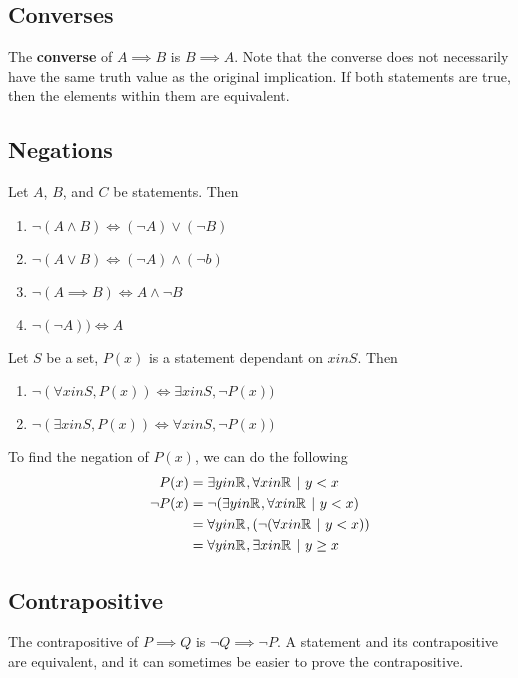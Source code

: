 \documentclass[12pt]{article}
\newcommand{\R}[1]{\mathbb{R}^{#1}}
\begin{document}
\subsection*{Converses}
The {\bf converse} of $A \implies B$ is $B \implies A$. Note that the converse does not necessarily have the same truth value as the original implication. If both statements are true, then the elements within them are equivalent.

\subsection*{Negations}
Let $A$, $B$, and $C$ be statements. Then
\begin{enumerate}
\item $\neg (A \land B) \iff (\neg A) \lor (\neg B)$
\item $\neg (A \lor B) \iff (\neg A) \land (\neg b)$
\item $\neg (A \implies B) \iff A \land \neg B$
\item $\neg (\neg A)) \iff A$
\end{enumerate}

Let $S$ be a set, $P(x)$ is a statement dependant on $x in S$. Then
\begin{enumerate}
\item $\neg (\forall x in S, P(x)) \iff \exists x in S, \neg P(x))$
\item $\neg (\exists x in S, P(x)) \iff \forall x in S, \neg P(x))$
\end{enumerate}

To find the negation of $P(x)$, we can do the following
\begin{align*}
P(x) &= \exists y in \R{}, \forall x in \R{} \suchthat y < x\\
\neg P(x) &= \neg (\exists y in \R{}, \forall x in \R{} \suchthat y < x)\\
&= \forall y in \R{}, (\neg (\forall x in \R{} \suchthat y < x))\\
&= \forall y in \R{}, \exists x in \R{} \suchthat y \geq x
\end{align*}

\subsection*{Contrapositive}
 The contrapositive of $P \implies Q$ is $\neg Q \implies \neg P$. A statement and its contrapositive are equivalent, and it can sometimes be easier to prove the contrapositive.
\end{document}
